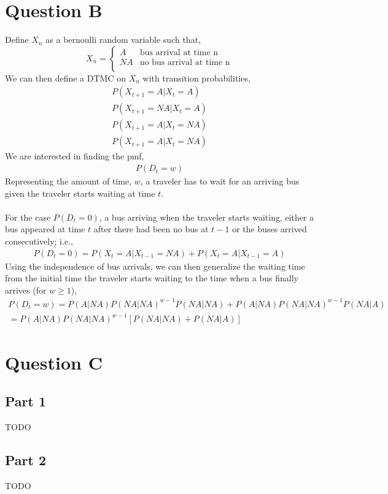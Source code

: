 \documentclass[10pt,a4paper]{article}
\begin{document}
\section{Question B}
Define $X_n$ as a bernoulli random variable such that,
\[X_n = \begin{cases} 
A & \text{bus arrival at time n} \\
NA & \text{no bus arrival at time n} \\
\end{cases}\]
We can then define a DTMC on \(X_n\) with transition probabilities,
\begin{gather*}
P(X_{t+1}=A|X_t=A)\\
P(X_{t+1}=NA|X_t=A)\\
P(X_{t+1}=A|X_t=NA)\\
P(X_{t+1}=A|X_t=NA)
\end{gather*}
We are interested in finding the pmf,
\begin{align*}
P(D_t=w)
\end{align*}
Representing the amount of time, $w$, a traveler has to wait for an arriving bus given the traveler starts waiting at time $t$.\\
\\
For the case $P(D_t=0)$, a bus arriving when the traveler starts waiting, either a bus appeared at time $t$ after there had been no bus at $t-1$ or the buses arrived consecutively; i.e.,
\begin{align*}
P(D_t=0)=P(X_t=A|X_{t-1}=NA)+P(X_t=A|X_{t-1}=A)
\end{align*}
Using the independence of bus arrivals, we can then generalize the waiting time from the initial time the traveler starts waiting to the time when a bus finally arrives (for \(w\geq1\)),
\begin{gather*}
P(D_t=w)=P(A|NA)P(NA|NA)^{w-1}P(NA|NA)+P(A|NA)P(NA|NA)^{w-1}P(NA|A)\\
=P(A|NA)P(NA|NA)^{w-1}[P(NA|NA)+P(NA|A)]
\end{gather*}
\section{Question C}
\subsection{Part 1}
TODO
\subsection{Part 2}
TODO
\end{document}
